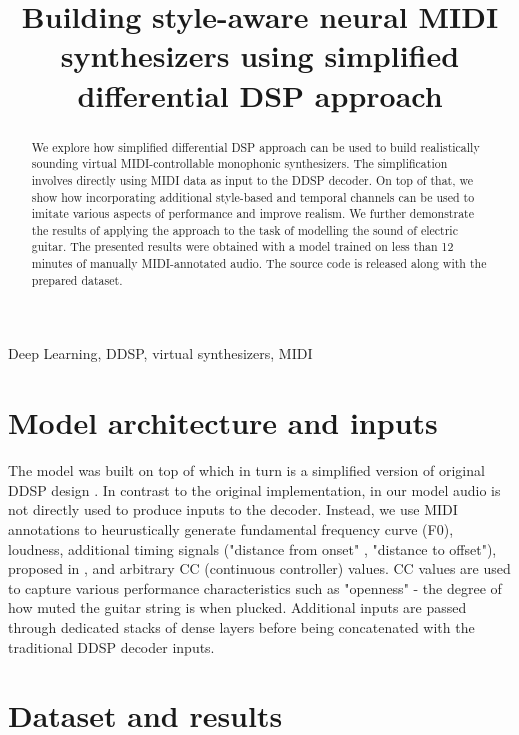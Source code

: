 \documentclass{article}
\title{Building style-aware neural MIDI synthesizers using simplified differential DSP approach}
\begin{document}
\tenpt
\maketitle

\begin{sloppy}
\begin{abstract}
We explore how simplified differential DSP approach can be used to build realistically sounding virtual MIDI-controllable monophonic synthesizers. The simplification involves directly using  MIDI data as input to the DDSP decoder. On top of that, we show how  incorporating additional style-based and temporal channels can be used to imitate various aspects of performance and improve realism.  We further demonstrate the results of applying the approach to the task of modelling the sound of electric guitar. The presented results were obtained with a model trained on less than 12 minutes of manually MIDI-annotated audio. The source code is released along with the prepared dataset.
\end{abstract}

\begin{keywords}
Deep Learning, DDSP, virtual synthesizers, MIDI
\end{keywords}

\section{Model architecture and inputs}
\label{sec:architecture_and_inputs}

The model was built on top of \cite{ddsp_simplified_repo} which in turn is a simplified version of original DDSP design \cite{ddsp}. In contrast to the original implementation, in our model audio is not directly used to produce inputs to the decoder. 
Instead, we use MIDI annotations to heurustically generate fundamental frequency curve (F0), loudness, additional timing signals ("distance from onset" , "distance to offset"), proposed in \cite{control-synthesis}, and arbitrary CC (continuous controller) values. CC values are used to capture various performance characteristics such as "openness" - the degree of how muted the guitar string is when plucked.
Additional inputs are passed through dedicated stacks of dense layers before being concatenated with the traditional DDSP decoder inputs.

\section{Dataset and results}
\label{sec:dataset_and_results}


\end{sloppy}
\end{document}
